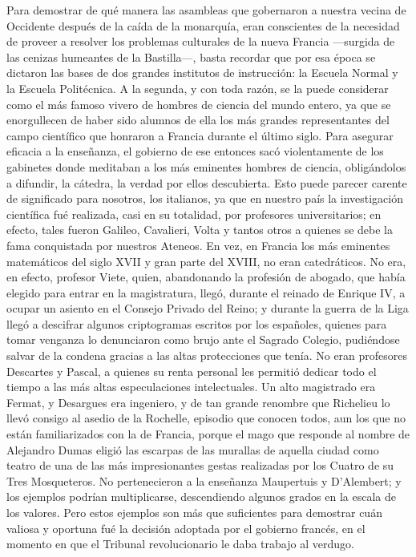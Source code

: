 \documentclass[a4paper, 12pt, draft]{article}
\begin{document}
{{Para demostrar de qué manera las asambleas que gobernaron a nuestra vecina de Occidente después de la caída de la monarquía, eran conscientes de la necesidad de proveer a resolver los problemas culturales de la nueva Francia ---surgida de las cenizas humeantes de la Bastilla---, basta recordar que por esa época se dictaron las bases de dos grandes institutos de instrucción: la Escuela Normal y la Escuela Politécnica. A la segunda, y con toda razón, se la puede considerar como el más famoso vivero de hombres de ciencia del mundo entero, ya que se enorgullecen de haber sido alumnos de ella los más grandes representantes del campo científico que honraron a Francia durante el último siglo. Para asegurar eficacia a la enseñanza, el
gobierno de ese entonces sacó violentamente de los gabinetes donde meditaban a los más eminentes hombres de ciencia, obligándolos a difundir,
la cátedra, la verdad por ellos descubierta. Esto puede parecer carente de significado para nosotros, los italianos, ya que en nuestro país la investigación científica fué realizada, casi en su totalidad, por profesores universitarios; en efecto, tales fueron Galileo, Cavalieri, Volta y tantos otros a quienes se debe la fama conquistada por nuestros Ateneos. En vez, en Francia los más eminentes matemáticos del siglo XVII y gran parte del XVIII, no eran catedráticos. No era, en efecto, profesor Viete, quien, abandonando la profesión de abogado, que había elegido para entrar en la magistratura, llegó, durante el reinado de Enrique IV, a ocupar un asiento en el Consejo Privado del Reino; y durante la guerra de la Liga llegó a descifrar algunos criptogramas escritos por los españoles, quienes para tomar venganza lo denunciaron como brujo ante el Sagrado Colegio, pudiéndose salvar de la condena gracias a las altas protecciones que tenía. No
eran profesores Descartes y Pascal, a quienes su renta personal les permitió dedicar todo el tiempo
a las más altas especulaciones intelectuales. Un alto
magistrado era Fermat, y Desargues era ingeniero, y de tan grande renombre que Richelieu lo llevó consigo al asedio de la Rochelle, episodio que conocen todos, aun los que no están familiarizados con la	de Francia, porque el mago que
responde al nombre de Alejandro Dumas eligió las escarpas de las murallas de aquella ciudad como teatro de una de las más impresionantes gestas realizadas por los Cuatro de su Tres Mosqueteros. No pertenecieron a la enseñanza Maupertuis y D'Alembert; y los ejemplos podrían multiplicarse, descendiendo algunos grados en la escala de los valores. Pero estos ejemplos son más que suficientes para demostrar cuán valiosa y oportuna fué la decisión adoptada por el gobierno francés, en el momento en que el Tribunal revolucionario le daba trabajo
al verdugo.

}}
\end{document}
